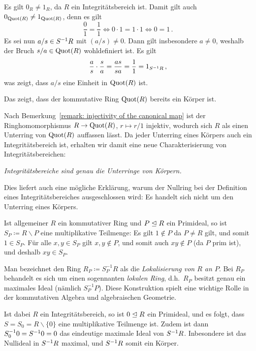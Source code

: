 Es gilt $0_R \neq 1_R$, da $R$ ein Integritätsbereich ist.
Damit gilt auch $0_{\Quot{R}} \neq 1_{\Quot{R}}$, denn es gilt
\[
        \frac{0}{1} = \frac{1}{1}
  \iff  0 \cdot 1 = 1 \cdot 1
  \iff  0 = 1 \,.
\]
Es sei nun $a/s \in \localset{R}{S}$ mit $(a/s) \neq 0$.
Dann gilt insbesondere $a \neq 0$, weshalb der Bruch $s/a \in \Quot{R}$ wohldefiniert ist.
Es gilt
\[
    \frac{a}{s} \cdot \frac{s}{a}
  = \frac{as}{sa}
  = \frac{1}{1}
  = 1_{\localset{R}{S}} \,,
\]
was zeigt, dass $a/s$ eine Einheit in $\Quot{R}$ ist.

Das zeigt, dass der kommutative Ring $\Quot{R}$ bereits ein Körper ist.

\begin{remark}
  Nach Bemerkung~\ref{remark: injectivity of the canonical map} ist der Ringhomomorphismus $R \to \Quot{R}$, $r \mapsto r/1$ injektiv, wodurch sich $R$ als einen Unterring von $\Quot{R}$ auffassen lässt.
  Da jeder Unterring eines Körpers auch ein Integritätsbereich ist, erhalten wir damit eine neue Charakterisierung von Integritätsbereichen:
  \begin{center}
    \emph{Integritätsbereiche sind genau die Unterringe von Körpern.}
  \end{center}
  
  Dies liefert auch eine mögliche Erklärung, warum der Nullring bei der Definition eines Integritätsbereiches ausgeschlossen wird:
  Es handelt sich nicht um den Unterring eines Körpers.
\end{remark}

\begin{remark}
  Ist allgemeiner $R$ ein kommutativer Ring und $P \ideal R$ ein Primideal, so ist $S_P \coloneqq R \smallsetminus P$ eine multiplikative Teilmenge:
  Es gilt $1 \notin P$ da $P \neq R$ gilt, und somit $1 \in S_P$.
  Für alle $x, y \in S_P$ gilt $x, y \notin P$, und somit auch $xy \notin P$ (da $P$ prim ist), und deshalb $xy \in S_P$.
  
  Man bezeichnet den Ring $R_P \coloneqq S_P^{-1} R$ als die \emph{Lokalisierung von $R$ an $P$}.
  Bei $R_P$ behandelt es sich um einen sogennanten \emph{lokalen Ring}, d.h.\ $R_P$ besitzt genau ein maximales Ideal (nämlich $S_P^{-1} P$).
  Diese Konstruktion spielt eine wichtige Rolle in der kommutativen Algebra und algebraischen Geometrie.
  
  Ist dabei $R$ ein Integritätsbereich, so ist $0 \ideal R$ ein Primideal, und es folgt, dass $S = S_0 = R \smallsetminus \{0\}$ eine multiplikative Teilmenge ist.
  Zudem ist dann $S_0^{-1} 0 = \localset{0}{S} = 0$ das eindeutige maximale Ideal von $\localset{R}{S}$.
  Inbesondere ist das Nullideal in $\localset{R}{S}$ maximal, und $\localset{R}{S}$ somit ein Körper.
\end{remark}





